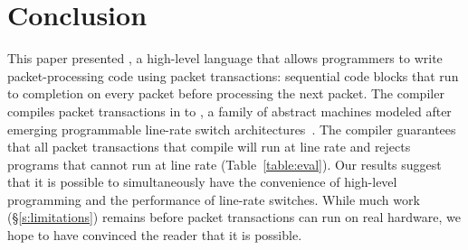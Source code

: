 \section{Conclusion}
\label{s:conclusion}

This paper presented \pktlanguage, a high-level language that allows
programmers to write packet-processing code using packet transactions:
sequential code blocks that run to completion on every packet before processing
the next packet. The \pktlanguage compiler compiles packet transactions in
\pktlanguage to \absmachine, a family of abstract machines modeled after
emerging programmable line-rate switch architectures~\cite{flexpipe, xpliant,
rmt}. The compiler guarantees that all packet transactions that compile will
run at line rate and rejects \pktlanguage programs that cannot run at line rate
(Table~\ref{table:eval}). Our results suggest that it is possible to
simultaneously have the convenience of high-level programming and the
performance of line-rate switches. While much work (\S\ref{s:limitations})
remains before packet transactions can run on real hardware, we hope to have
convinced the reader that it is possible.
